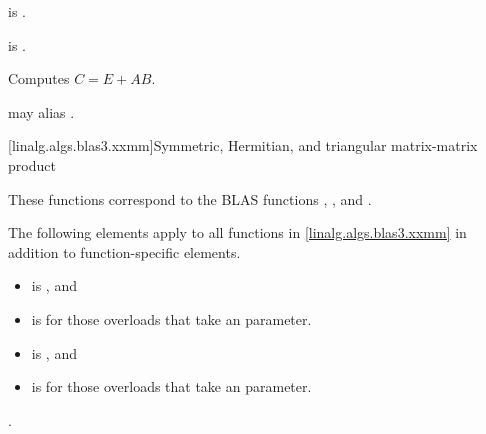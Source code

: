 \begin{itemdescr}
\pnum
\mandates
{} is .

\pnum
\expects
{} is .

\pnum
\effects
Computes $C = E + A B$.

\pnum
\remarks
{} may alias .
\end{itemdescr}

[linalg.algs.blas3.xxmm]{Symmetric, Hermitian, and triangular matrix-matrix product}

\pnum
\begin{note}
These functions correspond to the BLAS functions
, , and \supercite{blas3}.
\end{note}

\pnum
The following elements apply to all functions in \ref{linalg.algs.blas3.xxmm}
in addition to function-specific elements.

\pnum
\mandates
\begin{itemize}
\item
{}
is , and
\item
{}
is  for those overloads that take an  parameter.
\end{itemize}

\pnum
\expects
\begin{itemize}
\item
{} is , and
\item
{}
is  for those overloads that take an  parameter.
\end{itemize}

\pnum
\complexity
{}.


